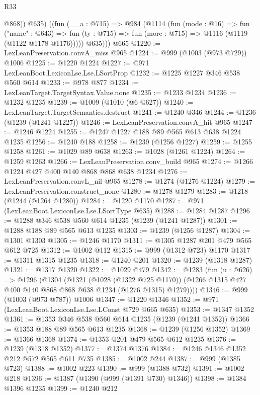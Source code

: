 \begin{lexlean}{R33}
\begin{coremodule}
            @868))
          @635)
        ((fun (__a : @715) =>
        @984
          (@1114
            (fun (mode : @16) =>
            fun ("name" : @643) =>
            fun (ty : @715) => fun (more : @715) => @1116 (@1119 (@1122 @1178 @1176)))))
          @635)))
    @665
@1220 := LexLeanPreservation.convA_miss @965
@1224 := @999 (@1003 (@973 @729)) @1006
@1225 := @1220 @1224
@1227 := @971 LexLeanBoot.LexiconLse.Lse.LSortProp
@1232 := @1225 @1227 @346 @538 @560 @614
@1233 := @978 @877
@1234 := LexLeanTarget.TargetSyntax.Value.none
@1235 := @1233 @1234
@1236 := @1232 @1235
@1239 := @1009 (@1010 (@6 @627))
@1240 := LexLeanTarget.TargetSemantics.destruct
@1241 := @1240 @346
@1244 := @1236 (@1239 (@1241 @1227))
@1246 := LexLeanPreservation.convA_hit @965
@1247 := @1246 @1224
@1255 := @1247 @1227 @188 @89 @565 @613 @638 @1224 @1235
@1256 := @1240 @188
@1258 := @1239 (@1256 @1227)
@1259 := @1255 @1258
@1261 := @1029 @89 @638
@1263 := @1028 (@1261 @1224)
@1264 := @1259 @1263
@1266 := LexLeanPreservation.conv_build @965
@1274 := @1266 @1224 @427 @400 @140 @868 @868 @638 @1234
@1276 := LexLeanPreservation.convL_nil @965
@1278 := @1274 (@1276 @1224)
@1279 := LexLeanPreservation.construct_none
@1280 := @1278 @1279
@1283 := @1218 (@1244 (@1264 @1280))
@1284 := @1220 @1170
@1287 := @971 (LexLeanBoot.LexiconLse.Lse.LSortType @635)
@1288 := @1284 @1287
@1296 := @1288 @346 @538 @560 @614 @1235 (@1239 (@1241 @1287))
@1301 := @1288 @188 @89 @565 @613 @1235
@1303 := @1239 (@1256 @1287)
@1304 := @1301 @1303
@1305 := @1246 @1170
@1311 := @1305 @1287 @201 @479 @565 @612 @725
@1312 := @1002 @112
@1315 := @999 (@1312 @723) @1170
@1317 := @1311 @1315 @1235
@1318 := @1240 @201
@1320 := @1239 (@1318 @1287)
@1321 := @1317 @1320
@1322 := @1029 @479
@1342 := @1283
    (fun (u : @626) =>
    @1296
      (@1304
        (@1321
          (@1028 (@1322 @725 @1170))
          (@1266 @1315 @427 @400 @140 @868 @868 @638 @1234 (@1276 @1315) @1279))))
@1346 := @999 (@1003 (@973 @787)) @1006
@1347 := @1220 @1346
@1352 := @971 (LexLeanBoot.LexiconLse.Lse.LConst @729 @665 @635)
@1353 := @1347 @1352
@1361 := @1353 @346 @538 @560 @614 @1235 (@1239 (@1241 @1352))
@1366 := @1353 @188 @89 @565 @613 @1235
@1368 := @1239 (@1256 @1352)
@1369 := @1366 @1368
@1374 := @1353 @201 @479 @565 @612 @1235
@1376 := @1239 (@1318 @1352)
@1377 := @1374 @1376
@1384 := @1246 @1346 @1352 @212 @572 @565 @611 @735
@1385 := @1002 @244
@1387 := @999 (@1385 @723)
@1388 := @1002 @223
@1390 := @999 (@1388 @732)
@1391 := @1002 @218
@1396 := @1387 (@1390 (@999 (@1391 @730) @1346))
@1398 := @1384 @1396 @1235
@1399 := @1240 @212

\end{coremodule}
\end{lexlean}
